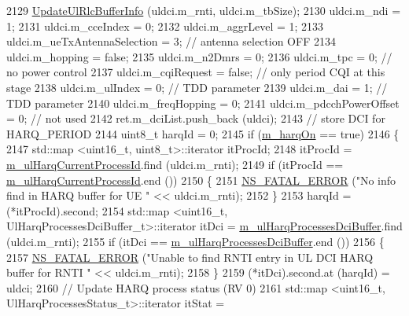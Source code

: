 \begin{DoxyCode}
2129       \hyperlink{classns3_1_1PssFfMacScheduler_a8731138acd04bc66f4896f5f823d12cc}{UpdateUlRlcBufferInfo} (uldci.m\_rnti, uldci.m\_tbSize);
2130       uldci.m\_ndi = 1;
2131       uldci.m\_cceIndex = 0;
2132       uldci.m\_aggrLevel = 1;
2133       uldci.m\_ueTxAntennaSelection = 3; \textcolor{comment}{// antenna selection OFF}
2134       uldci.m\_hopping = \textcolor{keyword}{false};
2135       uldci.m\_n2Dmrs = 0;
2136       uldci.m\_tpc = 0; \textcolor{comment}{// no power control}
2137       uldci.m\_cqiRequest = \textcolor{keyword}{false}; \textcolor{comment}{// only period CQI at this stage}
2138       uldci.m\_ulIndex = 0; \textcolor{comment}{// TDD parameter}
2139       uldci.m\_dai = 1; \textcolor{comment}{// TDD parameter}
2140       uldci.m\_freqHopping = 0;
2141       uldci.m\_pdcchPowerOffset = 0; \textcolor{comment}{// not used}
2142       ret.m\_dciList.push\_back (uldci);
2143       \textcolor{comment}{// store DCI for HARQ\_PERIOD}
2144       uint8\_t harqId = 0;
2145       \textcolor{keywordflow}{if} (\hyperlink{classns3_1_1PssFfMacScheduler_a7163e6149892abe4c17ce95be6bf1953}{m\_harqOn} == \textcolor{keyword}{true})
2146         \{
2147           std::map <uint16\_t, uint8\_t>::iterator itProcId;
2148           itProcId = \hyperlink{classns3_1_1PssFfMacScheduler_a9e2a7c8f3e5e48aa429a5a06f4f70a72}{m\_ulHarqCurrentProcessId}.find (uldci.m\_rnti);
2149           \textcolor{keywordflow}{if} (itProcId == \hyperlink{classns3_1_1PssFfMacScheduler_a9e2a7c8f3e5e48aa429a5a06f4f70a72}{m\_ulHarqCurrentProcessId}.end ())
2150             \{
2151               \hyperlink{group__fatal_ga5131d5e3f75d7d4cbfd706ac456fdc85}{NS\_FATAL\_ERROR} (\textcolor{stringliteral}{"No info find in HARQ buffer for UE "} << uldci.m\_rnti);
2152             \}
2153           harqId = (*itProcId).second;
2154           std::map <uint16\_t, UlHarqProcessesDciBuffer\_t>::iterator itDci = 
      \hyperlink{classns3_1_1PssFfMacScheduler_adfb2ba26a401807d40208e7b8f01f813}{m\_ulHarqProcessesDciBuffer}.find (uldci.m\_rnti);
2155           \textcolor{keywordflow}{if} (itDci == \hyperlink{classns3_1_1PssFfMacScheduler_adfb2ba26a401807d40208e7b8f01f813}{m\_ulHarqProcessesDciBuffer}.end ())
2156             \{
2157               \hyperlink{group__fatal_ga5131d5e3f75d7d4cbfd706ac456fdc85}{NS\_FATAL\_ERROR} (\textcolor{stringliteral}{"Unable to find RNTI entry in UL DCI HARQ buffer for RNTI "} << 
      uldci.m\_rnti);
2158             \}
2159           (*itDci).second.at (harqId) = uldci;
2160           \textcolor{comment}{// Update HARQ process status (RV 0)}
2161           std::map <uint16\_t, UlHarqProcessesStatus\_t>::iterator itStat = 

\end{DoxyCode}
